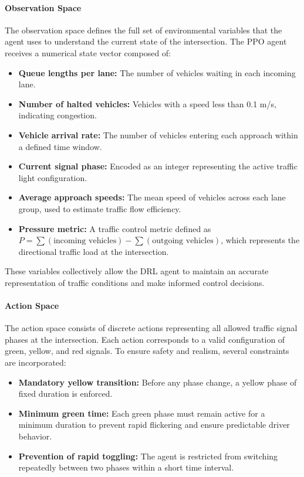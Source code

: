 \documentclass[11pt, a4paper]{report}
\begin{document}
\paragraph{Observation Space}

The observation space defines the full set of environmental variables that the agent uses to understand the current state of the intersection. The PPO agent receives a numerical state vector composed of:

\begin{itemize}
    \item \textbf{Queue lengths per lane:} The number of vehicles waiting in each incoming lane.
    \item \textbf{Number of halted vehicles:} Vehicles with a speed less than 0.1 m/s, indicating congestion.
    \item \textbf{Vehicle arrival rate:} The number of vehicles entering each approach within a defined time window.
    \item \textbf{Current signal phase:} Encoded as an integer representing the active traffic light configuration.
    \item \textbf{Average approach speeds:} The mean speed of vehicles across each lane group, used to estimate traffic flow efficiency.
    \item \textbf{Pressure metric:} A traffic control metric defined as $P = \sum(\text{incoming vehicles}) - \sum(\text{outgoing vehicles})$, which represents the directional traffic load at the intersection.
\end{itemize}

These variables collectively allow the DRL agent to maintain an accurate representation of traffic conditions and make informed control decisions.

\paragraph{Action Space}

The action space consists of discrete actions representing all allowed traffic signal phases at the intersection. Each action corresponds to a valid configuration of green, yellow, and red signals. To ensure safety and realism, several constraints are incorporated:

\begin{itemize}
    \item \textbf{Mandatory yellow transition:} Before any phase change, a yellow phase of fixed duration is enforced.
    \item \textbf{Minimum green time:} Each green phase must remain active for a minimum duration to prevent rapid flickering and ensure predictable driver behavior.
    \item \textbf{Prevention of rapid toggling:} The agent is restricted from switching repeatedly between two phases within a short time interval.
\end{itemize}
\end{document}
